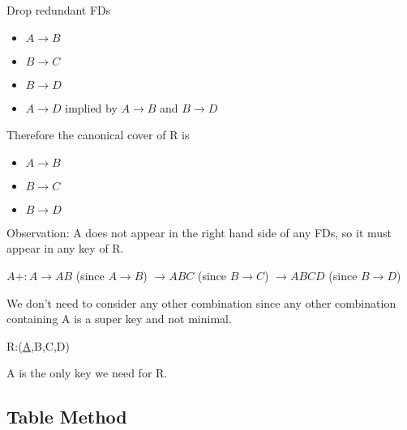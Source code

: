 \documentclass[a4paper]{article}
\begin{document}
Drop redundant FDs
\begin{itemize}
    \item $A \rightarrow B$
    \item $B \rightarrow C$
    \item $B \rightarrow D$
    \item \sout{$A \rightarrow D$} implied by $A \rightarrow B$ and $B \rightarrow D$
\end{itemize}

Therefore the canonical cover of R is

\begin{itemize}
    \item $A \rightarrow B$
    \item $B \rightarrow C$
    \item $B \rightarrow D$
\end{itemize}

Observation: A does not appear in the right hand side of any FDs, so it must appear in any key of R.

$A+: A \rightarrow AB$ (since $A \rightarrow B$) $\rightarrow ABC$ (since $B \rightarrow C$) $\rightarrow ABCD$ (since $B \rightarrow D$)

We don't need to consider any other combination since any other combination containing A is a super key and not minimal.

R:(\underline{A},B,C,D)

A is the only key we need for R.

\subsection{Table Method}
\end{document}
